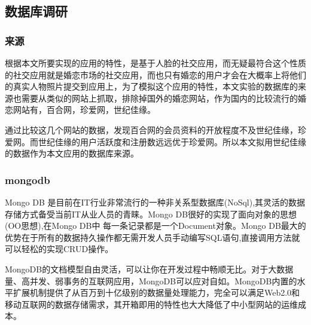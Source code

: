 \subsection{数据库调研}
\subsubsection{来源}
根据本文所要实现的应用的特性，是基于人脸的社交应用，而无疑最符合这个性质的社交应用就是婚恋市场的社交应用，而也只有婚恋的用户才会在大概率上将他们的真实人物照片提交到应用上，为了模拟这个应用的特性，本文实验的数据库的来源也需要从类似的网站上抓取，排除掉国外的婚恋网站，作为国内的比较流行的婚恋网站有，百合网，珍爱网，世纪佳缘。

通过比较这几个网站的数据，发现百合网的会员资料的开放程度不及世纪佳缘，珍爱网。而世纪佳缘的用户活跃度和注册数远远优于珍爱网。所以本文拟用世纪佳缘的数据作为本文应用的数据库来源。
\subsubsection{mongodb}
Mongo DB 是目前在IT行业非常流行的一种非关系型数据库(NoSql),其灵活的数据存储方式备受当前IT从业人员的青睐。Mongo DB很好的实现了面向对象的思想(OO思想),在Mongo DB中 每一条记录都是一个Document对象。Mongo DB最大的优势在于所有的数据持久操作都无需开发人员手动编写SQL语句,直接调用方法就可以轻松的实现CRUD操作。


MongoDB的文档模型自由灵活，可以让你在开发过程中畅顺无比。对于大数据量、高并发、弱事务的互联网应用，MongoDB可以应对自如。MongoDB内置的水平扩展机制提供了从百万到十亿级别的数据量处理能力，完全可以满足Web2.0和移动互联网的数据存储需求，其开箱即用的特性也大大降低了中小型网站的运维成本。

\pkuthssffaq

